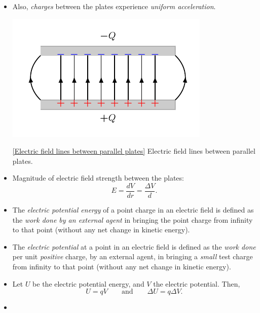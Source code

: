 \documentclass[oneside]{book}
\begin{document}
\begin{itemize}
  \item Also, \emph{charges} between the plates experience \emph{uniform acceleration}.
  \begin{center}
    \includegraphics[scale=1]{../images/ParallelPlates/testing.pdf}
    \captionsetup{type=figure}
    \caption[figure]{\ref{Electric field lines between parallel plates} Electric field lines between parallel plates.}
  \end{center}
  \item Magnitude of electric field strength between the plates:
  \[E=\frac{dV}{dr}=\frac{\Delta V}{d}.\]
  \item The \emph{electric potential energy} of a point charge in an electric field is defined as the \emph{work done by an external agent} in bringing the point charge from infinity to that point (without any net change in kinetic energy). 
  \item The \emph{electric potential} at a point in an electric field is defined as the \emph{work done} per unit \emph{positive} charge, by an external agent, in bringing a \emph{small} test charge from infinity to that point (without any net change in kinetic energy). 
  \item Let \(U\) be the electric potential energy, and \(V\) the electric potential. Then,
  \[U=qV \qquad\text{and}\qquad \Delta U=q\Delta V.\]
  \item ~
  \begin{center}
  \end{center}

\end{itemize}
\end{document}
